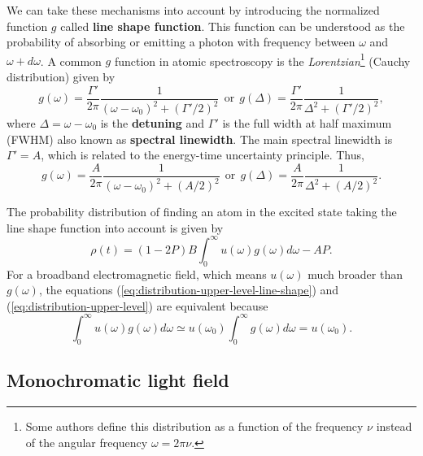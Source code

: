 We can take these mechanisms into account by introducing the normalized function $ g $ called \textbf{line shape function}. This function can be understood as the probability of absorbing or emitting a photon with frequency between $ \omega $ and $ \omega + d\omega $. A common $ g $ function in atomic spectroscopy is the \textit{Lorentzian}\footnote{Some authors define this distribution as a function of the frequency $ \nu $ instead of the angular frequency $ \omega = 2\pi\nu $.} (Cauchy distribution) given by
\begin{equation}
	g(\omega) = \frac{\Gamma'}{2\pi} \frac{1}{(\omega - \omega_0)^2 + (\Gamma' / 2)^2}\ \ \textrm{or}\ \ g(\Delta) = \frac{\Gamma'}{2\pi} \frac{1}{\Delta^2 + (\Gamma' / 2)^2},
\end{equation}
where $ \Delta = \omega - \omega_0 $ is the \textbf{detuning} and $ \Gamma' $ is the full width at half maximum (FWHM) also known as \textbf{spectral linewidth}. The main spectral linewidth is $ \Gamma' = A $, which is related to the energy-time uncertainty principle. Thus,
\begin{equation}
	g(\omega) = \frac{A}{2\pi} \frac{1}{(\omega - \omega_0)^2 + (A / 2)^2}\ \ \textrm{or}\ \ g(\Delta) = \frac{A}{2\pi} \frac{1}{\Delta^2 + (A / 2)^2}.
	\label{eq:line-shape-simplest-case}
\end{equation}

The probability distribution of finding an atom in the excited state taking the line shape function into account is given by
\begin{equation}
	\rho(t) = (1 - 2P) B \int_{0}^{\infty} u(\omega) g(\omega) d\omega - A P.
	\label{eq:distribution-upper-level-line-shape}
\end{equation}
For a broadband electromagnetic field, which means $ u(\omega) $ much broader than $ g(\omega) $, the equations (\ref{eq:distribution-upper-level-line-shape}) and (\ref{eq:distribution-upper-level}) are equivalent because
\begin{equation}
	\int_{0}^{\infty} u(\omega) g(\omega) d\omega \simeq u(\omega_0) \int_{0}^{\infty} g(\omega) d\omega = u(\omega_0).
	\label{eq:broadband-light-relation}
\end{equation}

%
\subsection{Monochromatic light field}
%

